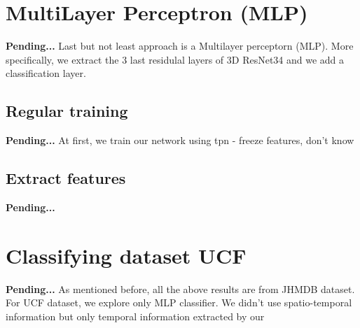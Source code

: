 



\section{MultiLayer Perceptron (MLP)}
\textbf{Pending...}
Last but not least approach is a Multilayer perceptorn (MLP). More specifically, we extract the 3 last residulal layers of 3D ResNet34
and we add a classification layer. 

\subsection{Regular training}
\textbf{Pending...}
At first, we train our network using 
tpn - freeze features, don't know



\subsection{Extract features}
\textbf{Pending...}



\section{Classifying dataset UCF}
\textbf{Pending...}
As mentioned before, all the above results are from JHMDB dataset. For UCF dataset, we explore only MLP classifier. We didn't use spatio-temporal
information but only temporal information extracted by our


